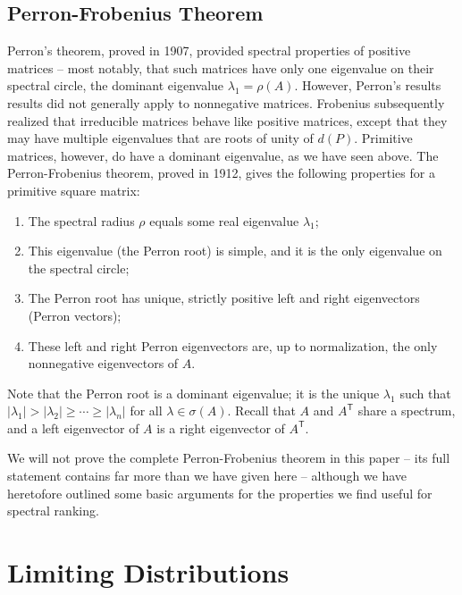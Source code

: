 \documentclass[12pt]{article}
\newcommand{\transpose}[1]{#1^{\mathsf{T}}}
\begin{document}
\subsection{Perron-Frobenius Theorem}
Perron's theorem, proved in 1907, provided spectral properties of positive
matrices -- most notably, that such matrices have only one eigenvalue on their
spectral circle, the dominant eigenvalue $\lambda_1=\rho(A)$. However, Perron's
results results did not generally apply to nonnegative matrices. Frobenius
subsequently realized that irreducible matrices behave like positive matrices,
except that they may have multiple eigenvalues that are roots of unity of
$d(P)$. Primitive matrices, however, do have a dominant eigenvalue, as we have
seen above. The Perron-Frobenius theorem, proved in 1912, gives the following
properties for a primitive square matrix:
\begin{enumerate}
\item The spectral radius $\rho$ equals some real eigenvalue $\lambda_1$;
\item This eigenvalue (the Perron root) is simple, and it is the only eigenvalue on the spectral circle;
\item The Perron root has unique, strictly positive left and right eigenvectors (Perron vectors);
\item These left and right Perron eigenvectors are, up to normalization, the only nonnegative eigenvectors of $A$.
\end{enumerate}
Note that the Perron root is a dominant eigenvalue; it is the unique $\lambda_1$
such that $|\lambda_1|>|\lambda_2|\geq\cdots\geq |\lambda_{n}|$ for all
$\lambda \in \sigma(A)$. Recall that $A$ and $\transpose{A}$ share a spectrum,
and a left eigenvector of $A$ is a right eigenvector of $\transpose{A}$.

We will not prove the complete Perron-Frobenius theorem in this paper -- its
full statement contains far more than we have given here -- although we have
heretofore outlined some basic arguments for the properties we find useful for
spectral ranking.




\section{Limiting Distributions}
\end{document}
